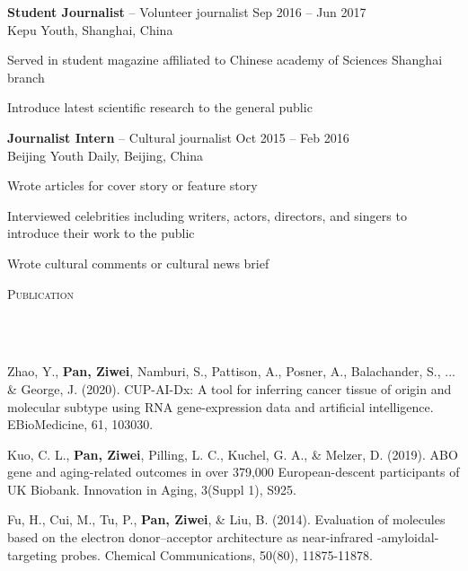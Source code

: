 \documentclass{article}
\newcommand{\header}[1]{{
\hspace*{-15pt}\vspace*{6pt} \textsc{#1}} \vspace*{-6pt} 
\lineunder
}
\newcommand{\lineunder}{
\vspace*{-8pt} \\ \hspace*{-18pt} 
\hrulefill \\
}
\newcommand{\employer}[4]{{
\vspace*{2pt}%
\textbf{#1} #2 \hfill #3\\ #4 \vspace*{2pt}}
}
\renewcommand{\labelitemii}{
$\vcenter{\hbox{\tiny$\bullet$}}$\hspace*{-3pt}
}
\newenvironment{bullet-list-major}{
\begin{list}{\labelitemii}{\setlength\leftmargin{3pt} 
\topsep 0pt \itemsep -2pt}}{\vspace*{4pt}\end{list}
}
\newenvironment{bullet-list-minor}{
\begin{list}{\labelitemii}{\setlength\leftmargin{15pt} 
\topsep 0pt \itemsep -2pt}}{\vspace*{4pt}\end{list}
}
\begin{document}
    \employer{Student Journalist}{-- Volunteer journalist}{Sep 2016 -- Jun 2017}{Kepu Youth, Shanghai, China}
	\begin{bullet-list-minor}
	\item Served in student magazine affiliated to Chinese academy of Sciences Shanghai branch
	\item Introduce latest scientific research to the general public  
    \end{bullet-list-minor}

    \employer{Journalist Intern}{-- Cultural journalist}{Oct 2015 -- Feb 2016}{Beijing Youth Daily, Beijing, China}
	\begin{bullet-list-minor}
	\item Wrote articles for cover story or feature story
	\item Interviewed celebrities including writers, actors, directors, and singers to introduce their work to the public  \item Wrote cultural comments or cultural news brief
    \end{bullet-list-minor}

\vspace*{4pt}%
\header{Publication}
    \begin{bullet-list-major}
    \item Zhao, Y., \textbf{Pan, Ziwei}, Namburi, S., Pattison, A., Posner, A., Balachander, S., ... \& George, J. (2020). CUP-AI-Dx: A tool for inferring cancer tissue of origin and molecular subtype using RNA gene-expression data and artificial intelligence. EBioMedicine, 61, 103030.
    \vspace{2pt}
    \item Kuo, C. L., \textbf{Pan, Ziwei}, Pilling, L. C., Kuchel, G. A., \& Melzer, D. (2019). ABO gene and aging-related outcomes in over 379,000 European-descent participants of UK Biobank. Innovation in Aging, 3(Suppl 1), S925.
    \vspace{2pt}
    \item Fu, H., Cui, M., Tu, P., \textbf{Pan, Ziwei}, \& Liu, B. (2014). Evaluation of molecules based on the electron donor–acceptor architecture as near-infrared  \textbeta-amyloidal-targeting probes. Chemical Communications, 50(80), 11875-11878.
    \end{bullet-list-major}
\end{document}
